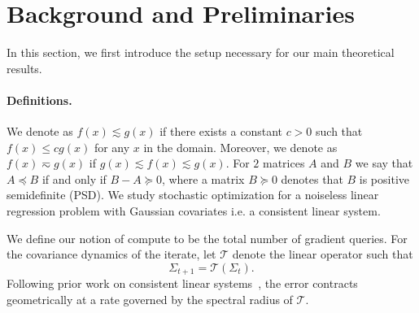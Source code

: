 \documentclass{article}
\newcommand{\T}{\mathcal{T}}
\begin{document}
\section{Background and Preliminaries}
\label{sec:main_results}
In this section, we first introduce the setup necessary for our main theoretical results.

\label{sec:setup_and_notation}
\paragraph{Definitions.} We denote as $f(x) \lesssim g(x)$ if there exists a constant $c>0$ such that $f(x) \leq c g(x)$ for any $x$ in the domain. Moreover, we denote as $f(x) \eqsim g(x)$ if $g(x) \lesssim f(x) \lesssim g(x)$. For $2$ matrices $A$ and $B$ we say that $A \preceq B$ if and only if $B - A \succeq 0$, where a matrix $B \succeq 0$ denotes that $B$ is positive semidefinite (PSD). We study stochastic optimization for a noiseless linear regression problem with Gaussian covariates i.e. a consistent linear system. 

We define our notion of compute to be the total number of gradient queries. For the covariance dynamics of the iterate, let $\T$ denote the linear operator such that
\[
\Sigma_{t+1}=\T(\Sigma_t).
\]
Following prior work on consistent linear systems~\citep{wu2022last,zou2021benign,meterez2025simplified}, the error contracts geometrically at a rate governed by the spectral radius of $\T$. 
\end{document}
